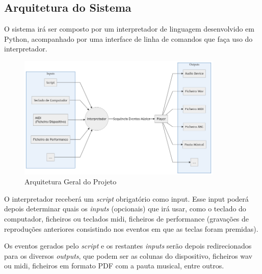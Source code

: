 \subsection{Arquitetura do Sistema}
O sistema irá ser composto por um interpretador de linguagem desenvolvido em Python, acompanhado por uma interface de linha de comandos que faça uso do interpretador.
\begin{figure}[h]
\begin{center}
    \includegraphics[width=0.87\textwidth]{img/diagram_architecture.png}
\end{center}
\caption{Arquitetura Geral do Projeto}
\end{figure}

O interpretador receberá um \textit{script} obrigatório como input. Esse input poderá depois determinar quais os \textit{inputs} (opcionais) que irá usar, como o teclado do computador, ficheiros ou teclados \acrshort{midi}, ficheiros de performance (gravações de reproduções anteriores consistindo nos eventos em que as teclas foram premidas).

Os eventos gerados pelo \textit{script} e os restantes \textit{inputs} serão depois redirecionados para os diversos \textit{outputs}, que podem ser as colunas do dispositivo, ficheiros \acrshort{wav} ou \acrshort{midi}, ficheiros em formato PDF com a pauta musical, entre outros.


